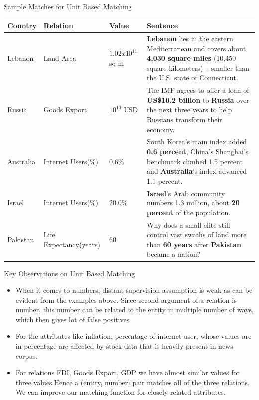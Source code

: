 \documentclass{beamer}
\begin{document}
\begin{frame}{Sample Matches for Unit Based Matching}


 \begin{table}
 \centering
 \tiny
 \begin{tabularx}{\textwidth}{|l|l|l|>{\raggedright}X|}
 \hline
 \textbf{Country} & \textbf{Relation} & \textbf{Value} & \textbf{Sentence}\tabularnewline
 \hline
 Lebanon & Land Area & $1.02 x 10^{11}$ sq m & \textbf{Lebanon} lies in the eastern Mediterranean and covers about \textbf{4,030 square miles} (10,450 square kilometers) -- smaller than the U.S. state of Connecticut.\tabularnewline
  \hline
  Russia & Goods Export & $ 10^{10}$ USD & The IMF agrees to offer a loan of \textbf{US\$10.2 billion} to \textbf{Russia} over the next three years to help Russians transform their economy.\tabularnewline
  \hline
  Australia & Internet Users(\%) & 0.6\% & South Korea's main index added \textbf{0.6 percent}, China's Shanghai's benchmark climbed 1.5 percent and \textbf{Australia}'s index advanced 1.1 percent.\tabularnewline
  \hline
  Israel & Internet Users(\%) & 20.0\% & \textbf{Israel}'s Arab community numbers 1.3 million, about \textbf{20 percent} of the population.\tabularnewline
  \hline
  Pakistan & Life Expectancy(years) & 60 & Why does a small elite still control vast swaths of land more than \textbf{60 years} after \textbf{Pakistan} became a nation?\tabularnewline
  \hline
 \end{tabularx}
 \end{table}
 \end{frame}

\begin{frame}{Key Observations on Unit Based Matching}
 
 \begin{itemize}
  \item  When it comes to numbers, distant supervision assumption is weak as can be evident from the examples above. 
  Since second argument of a relation is number, this number can be related to the entity in multiple number of ways, which then gives lot of false positives.
  \item For the attributes like inflation, percentage of internet user, whose values are in percentage are affected by stock data that is heavily present in news corpus.
  \item For relations FDI, Goods Export, GDP we have almost similar values for three values.Hence a (entity, number) pair matches all of the three relations. We can improve our matching function for closely related attributes.
 \end{itemize}

 
\end{frame}
\end{document}
